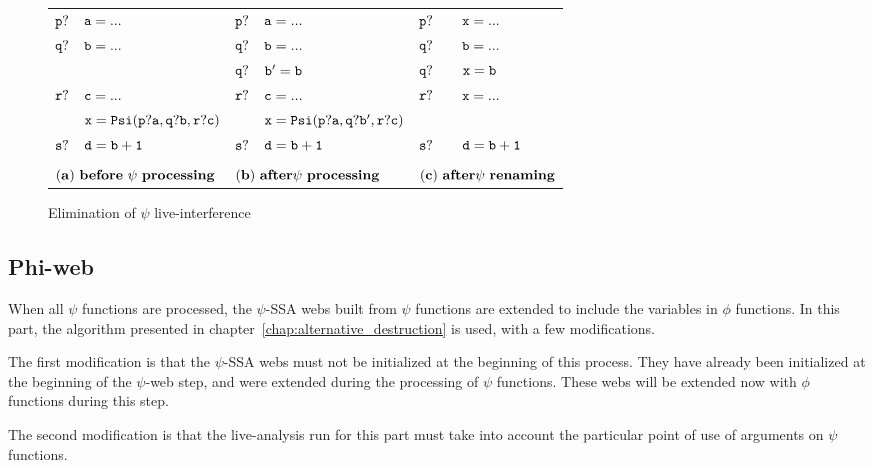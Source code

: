 \begin{figure}
\begin{center}
\footnotesize
\begin{tabular}{llllll}
${\tt p?}$ & ${\tt a = ...}$              & ${\tt p?}$ & ${\tt a = ...}$                 & ${\tt p?}$ & ${\tt x = ...}$\\
${\tt q?}$ & ${\tt b = ...}$              & ${\tt q?}$ & ${\tt b = ...}$                 & ${\tt q?}$ & ${\tt b = ...}$\\
           &                              & ${\tt q?}$ & ${\tt b' = b}$                  & ${\tt q?}$ & ${\tt x = b}$\\
${\tt r?}$ & ${\tt c = ...}$              & ${\tt r?}$ & ${\tt c = ...}$                 & ${\tt r?}$ & ${\tt x = ...}$ \\
           & ${\tt x = Psi(p?a,q?b,r?c)}$ &            & ${\tt x = Psi(p?a,q?b',r?c)}$   &            & \\
${\tt s?}$ & ${\tt d = b+1}$              & ${\tt s?}$ & ${\tt d = b+1}$                 & ${\tt s?}$ & ${\tt d = b+1}$ \\
\\
\multicolumn{2}{l}{${\tt{\bf (a)\ before\ \psi\ processing}}$} & \multicolumn{2}{l}{${\tt{\bf (b)\ after \psi\ processing}}$} & \multicolumn{2}{l}{${\tt{\bf (c)\ after \psi\ renaming}}$} \\
\end{tabular}
\caption{Elimination of $\psi$ live-interference}
\label{fig:live_interference}
\end{center}
\end{figure}

\subsection{Phi-web}

When all $\psi$ functions are processed, the $\psi$-SSA webs built
from $\psi$ functions are extended to include the variables in $\phi$
functions. In this part, the algorithm presented in
chapter~\ref{chap:alternative_destruction} is used, with a few
modifications.

The first modification is that the $\psi$-SSA webs must not be
initialized at the beginning of this process. They have already been
initialized at the beginning of the $\psi$-web step, and were extended
during the processing of $\psi$ functions. These webs will be extended
now with $\phi$ functions during this step.

The second modification is that the live-analysis run for this part
must take into account the particular point of use of arguments on
$\psi$ functions.

